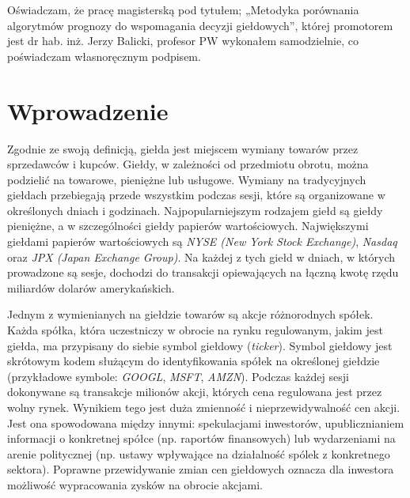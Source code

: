 \documentclass[a4paper, twoside, 11pt, openright]{article}
\begin{document}
Oświadczam, że pracę magisterską pod tytułem; „Metodyka porównania algorytmów prognozy do wspomagania decyzji giełdowych”, której promotorem jest dr hab. inż. Jerzy Balicki, profesor PW wykonałem samodzielnie, co poświadczam własnoręcznym podpisem.

\bigskip

\begin{flushright}
\hdashrule{5cm}{1pt}{1pt}
\end{flushright}


\endgroup


\cleardoublepage

\tableofcontents

\cleardoublepage

\section{Wprowadzenie}

Zgodnie ze swoją definicją, giełda jest miejscem wymiany towarów przez sprzedawców i kupców. Giełdy, w zależności od przedmiotu obrotu, można podzielić na towarowe, pieniężne lub usługowe. Wymiany na tradycyjnych giełdach przebiegają przede wszystkim podczas sesji, które są organizowane w określonych dniach i godzinach. Najpopularniejszym rodzajem giełd są giełdy pieniężne, a w szczególności giełdy papierów wartościowych. Największymi giełdami papierów wartościowych są \textit{NYSE (New York Stock Exchange)}\cite{nyse}, \textit{Nasdaq}\cite{nasdaq} oraz \textit{JPX (Japan Exchange Group)}\cite{jpx}. Na każdej z tych giełd w dniach, w których prowadzone są sesje, dochodzi do transakcji opiewających na łączną kwotę rzędu miliardów dolarów amerykańskich.

\bigskip

 Jednym z wymienianych na giełdzie towarów są akcje różnorodnych spółek. Każda spółka, która uczestniczy w obrocie na rynku regulowanym, jakim jest giełda, ma przypisany do siebie symbol giełdowy (\textit{ticker}). Symbol giełdowy jest skrótowym kodem służącym do identyfikowania spółek na określonej giełdzie (przykładowe symbole: \textit{GOOGL}, \textit{MSFT}, \textit{AMZN}). Podczas każdej sesji dokonywane są transakcje milionów akcji, których cena regulowana jest przez wolny rynek. Wynikiem tego jest duża zmienność i nieprzewidywalność cen akcji. Jest ona spowodowana między innymi: spekulacjami inwestorów, upublicznianiem informacji o konkretnej spółce (np. raportów finansowych) lub wydarzeniami na arenie politycznej (np. ustawy wpływające na działalność spólek z konkretnego sektora). Poprawne przewidywanie zmian cen giełdowych oznacza dla inwestora możliwość wypracowania zysków na obrocie akcjami.
 
\end{document}
